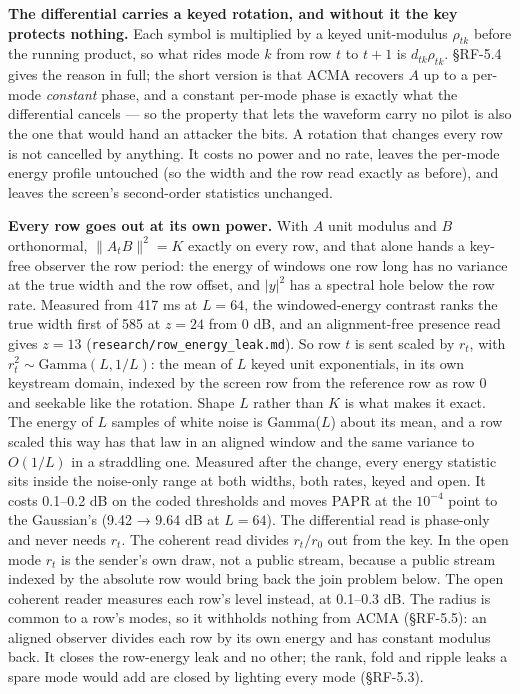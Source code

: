 \documentclass[10pt,letterpaper,twocolumn]{article}
\begin{document}
\textbf{The differential carries a keyed rotation, and without it the key protects nothing.} Each symbol is multiplied by a keyed unit-modulus \(\rho_{tk}\) before the running product, so what rides mode \(k\) from row \(t\) to \(t+1\) is \(d_{tk}\rho_{tk}\). §RF-5.4 gives the reason in full; the short version is that ACMA recovers \(A\) up to a per-mode \emph{constant} phase, and a constant per-mode phase is exactly what the differential cancels --- so the property that lets the waveform carry no pilot is also the one that would hand an attacker the bits. A rotation that changes every row is not cancelled by anything. It costs no power and no rate, leaves the per-mode energy profile untouched (so the width and the row read exactly as before), and leaves the screen's second-order statistics unchanged.

\textbf{Every row goes out at its own power.} With \(A\) unit modulus and \(B\) orthonormal, \(\lVert A_t B\rVert^2 = K\) exactly on every row, and that alone hands a key-free observer the row period: the energy of windows one row long has no variance at the true width and the row offset, and \(|y|^2\) has a spectral hole below the row rate. Measured from 417 ms at \(L = 64\), the windowed-energy contrast ranks the true width first of 585 at \(z = 24\) from 0 dB, and an alignment-free presence read gives \(z = 13\) (\texttt{research/\allowbreak{}row\_\allowbreak{}energy\_\allowbreak{}leak.\allowbreak{}md}). So row \(t\) is sent scaled by \(r_t\), with \(r_t^2 \sim \mathrm{Gamma}(L, 1/L)\): the mean of \(L\) keyed unit exponentials, in its own keystream domain, indexed by the screen row from the reference row as row 0 and seekable like the rotation. Shape \(L\) rather than \(K\) is what makes it exact. The energy of \(L\) samples of white noise is Gamma(\(L\)) about its mean, and a row scaled this way has that law in an aligned window and the same variance to \(O(1/L)\) in a straddling one. Measured after the change, every energy statistic sits inside the noise-only range at both widths, both rates, keyed and open. It costs 0.1--0.2 dB on the coded thresholds and moves PAPR at the \(10^{-4}\) point to the Gaussian's (9.42 → 9.64 dB at \(L=64\)). The differential read is phase-only and never needs \(r_t\). The coherent read divides \(r_t / r_0\) out from the key. In the open mode \(r_t\) is the sender's own draw, not a public stream, because a public stream indexed by the absolute row would bring back the join problem below. The open coherent reader measures each row's level instead, at 0.1--0.3 dB. The radius is common to a row's modes, so it withholds nothing from ACMA (§RF-5.5): an aligned observer divides each row by its own energy and has constant modulus back. It closes the row-energy leak and no other; the rank, fold and ripple leaks a spare mode would add are closed by lighting every mode (§RF-5.3).
\end{document}
